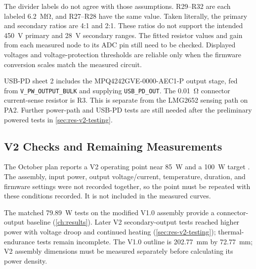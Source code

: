 The divider labels do not agree with those assumptions. R29--R32 are each labeled \SI{6.2}{\mega\ohm}, and R27--R28 have the same value. Taken literally, the primary and secondary ratios are 4:1 and 2:1. These ratios do not support the intended \SI{450}{\volt} primary and \SI{28}{\volt} secondary ranges. The fitted resistor values and gain from each measured node to its ADC pin still need to be checked. Displayed voltages and voltage-protection thresholds are reliable only when the firmware conversion scales match the measured circuit.

USB-PD sheet 2 includes the MPQ4242GVE-0000-AEC1-P output stage, fed from \texttt{V\_PW\_OUTPUT\_BULK} and supplying \texttt{USB\_PD\_OUT}. The \SI{0.01}{\ohm} connector current-sense resistor is R3. This is separate from the LMG2652 sensing path on PA2. Further power-path and USB-PD tests are still needed after the preliminary powered tests in \cref{sec:res-v2-testing}.

\Needspace{0.30\textheight}
\subsection{V2 Checks and Remaining Measurements}

The October plan reports a V2 operating point near \SI{85}{\watt} and a \SI{100}{\watt} target \cite{projectOctoberPlan}. The assembly, input power, output voltage/current, temperature, duration, and firmware settings were not recorded together, so the point must be repeated with these conditions recorded. It is not included in the measured curves.

The matched \SI{79.89}{\watt} tests on the modified V1.0 assembly provide a connector-output baseline (\cref{ch:results}). Later V2 secondary-output tests reached higher power with voltage droop and continued heating (\cref{sec:res-v2-testing}); thermal-endurance tests remain incomplete. The V1.0 outline is \SI{202.77}{\milli\metre} by \SI{72.77}{\milli\metre}; V2 assembly dimensions must be measured separately before calculating its power density.
